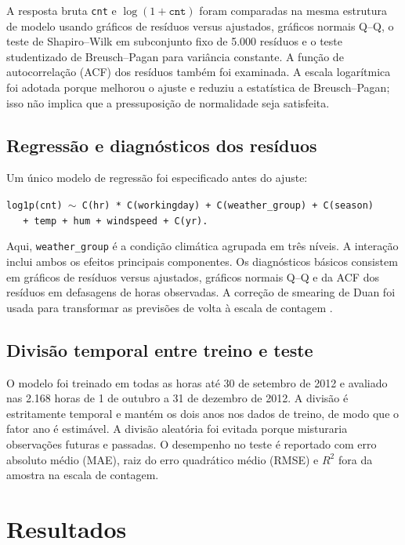 \documentclass[12pt]{article}
\begin{document}
A resposta bruta \texttt{cnt} e $\log(1+\texttt{cnt})$ foram comparadas na mesma
estrutura de modelo usando gráficos de resíduos versus ajustados, gráficos
normais Q--Q, o teste de Shapiro--Wilk em subconjunto fixo de 5.000 resíduos e o
teste studentizado de Breusch--Pagan para variância constante. A função de
autocorrelação (ACF) dos resíduos também foi examinada. A escala logarítmica foi
adotada porque melhorou o ajuste e reduziu a estatística de Breusch--Pagan; isso
não implica que a pressuposição de normalidade seja satisfeita.

\subsection{Regressão e diagnósticos dos resíduos}

Um único modelo de regressão foi especificado antes do ajuste:
\begin{center}
\texttt{log1p(cnt) $\sim$ C(hr) * C(workingday) + C(weather\_group) + C(season)} \\
\texttt{$\quad$ + temp + hum + windspeed + C(yr).}
\end{center}
Aqui, \texttt{weather\_group} é a condição climática agrupada em três níveis. A
interação inclui ambos os efeitos principais componentes. Os diagnósticos
básicos consistem em gráficos de resíduos versus ajustados, gráficos normais
Q--Q e da ACF dos resíduos em defasagens de horas observadas. A correção de
smearing de Duan foi usada para transformar as previsões de volta à escala de
contagem \cite{duan1983}.

\subsection{Divisão temporal entre treino e teste}

O modelo foi treinado em todas as horas até 30 de setembro de 2012 e avaliado nas
2.168 horas de 1 de outubro a 31 de dezembro de 2012. A divisão é estritamente
temporal e mantém os dois anos nos dados de treino, de modo que o fator ano é
estimável. A divisão aleatória foi evitada porque misturaria observações futuras
e passadas. O desempenho no teste é reportado com erro absoluto médio (MAE),
raiz do erro quadrático médio (RMSE) e $R^2$ fora da amostra na escala de
contagem.

\section{Resultados}
\end{document}
